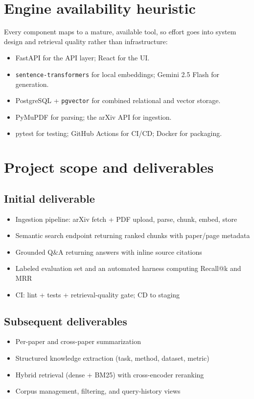 \documentclass[11pt,a4paper]{article}
\begin{document}
\section{Engine availability heuristic}
Every component maps to a mature, available tool, so effort goes into system design and retrieval quality rather than infrastructure:
\begin{itemize}[leftmargin=0.7cm]
    \item FastAPI for the API layer; React for the UI.
    \item \texttt{sentence-transformers} for local embeddings; Gemini 2.5 Flash for generation.
    \item PostgreSQL + \texttt{pgvector} for combined relational and vector storage.
    \item PyMuPDF for parsing; the arXiv API for ingestion.
    \item pytest for testing; GitHub Actions for CI/CD; Docker for packaging.
\end{itemize}

\section{Project scope and deliverables}
\subsection{Initial deliverable}
\begin{itemize}[leftmargin=0.7cm]
    \item Ingestion pipeline: arXiv fetch + PDF upload, parse, chunk, embed, store
    \item Semantic search endpoint returning ranked chunks with paper/page metadata
    \item Grounded Q\&A returning answers with inline source citations
    \item Labeled evaluation set and an automated harness computing Recall@k and MRR
    \item CI: lint + tests + retrieval-quality gate; CD to staging
\end{itemize}

\subsection{Subsequent deliverables}
\begin{itemize}[leftmargin=0.7cm]
    \item Per-paper and cross-paper summarization
    \item Structured knowledge extraction (task, method, dataset, metric)
    \item Hybrid retrieval (dense + BM25) with cross-encoder reranking
    \item Corpus management, filtering, and query-history views
\end{itemize}
\end{document}
